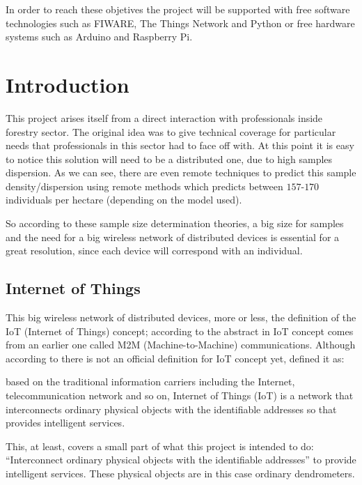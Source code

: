 \documentclass[11pt,a4paper,dvipsnames,twoside]{article}
\begin{document}
In order to reach these objetives the project will be supported with free software technologies such as FIWARE\cite{FIWARE}, The Things Network\cite{TTN} and Python\cite{Python} or free hardware systems such as Arduino\cite{Arduino} and Raspberry Pi\cite{Raspberrypi}.

\clearpage{\pagestyle{empty}\cleardoublepage}
\section{Introduction}\thispagestyle{plain}
This project arises itself from a direct interaction with professionals inside forestry sector. The original idea was to give technical coverage for particular needs that professionals in this sector had to face off with. At this point it is easy to notice this solution will need to be a distributed one, due to high samples dispersion. As we can see, there are even remote techniques to predict this sample density/dispersion using remote methods which predicts between $157$-$170$ individuals per hectare\cite{ForestStandVol} (depending on the model used). 

So according to these sample size determination theories, a big size for samples and the need for a big wireless network of distributed devices is essential for a great resolution, since each device will correspond with an individual.

\subsection{Internet of Things}
This big wireless network of distributed devices, more or less, the definition of the IoT (Internet of Things) concept; according to the abstract in \cite{IoTOverview} IoT concept comes from an earlier one called M2M (Machine-to-Machine) communications. Although according to \cite[p.~1(71)]{IoTOverview} there is not an official definition for IoT concept yet, \cite[p.~2(920)]{IoTObjetives} defined it as:

\begin{quoting}
  based on the traditional information carriers including the Internet, telecommunication  network  and  so  on,  Internet  of Things (IoT) is a network that interconnects ordinary physical  objects  with  the identifiable addresses  so that provides intelligent services.
\end{quoting}

This, at least, covers a small part of what this project is intended to do: \enquote{Interconnect ordinary physical objects with the identifiable addresses} to provide intelligent services. These physical objects are in this case ordinary dendrometers.
\end{document}
